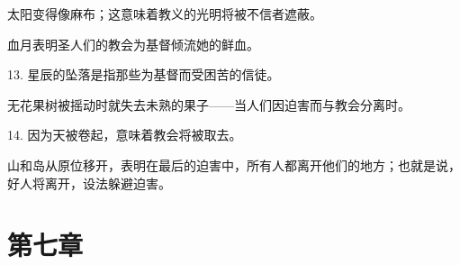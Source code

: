  太阳变得像麻布；这意味着教义的光明将被不信者遮蔽。\par

 血月表明圣人们的教会为基督倾流她的鲜血。\par

13.  星辰的坠落是指那些为基督而受困苦的信徒。\par

 无花果树被摇动时就失去未熟的果子——当人们因迫害而与教会分离时。\par

14.  因为天被卷起，意味着教会将被取去。\par

 山和岛从原位移开，表明在最后的迫害中，所有人都离开他们的地方；也就是说，好人将离开，设法躲避迫害。\par


\section{第七章}

